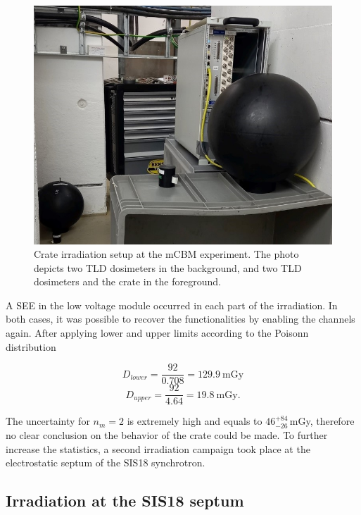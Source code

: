 \newpage
\begin{figure}[!h]
    \centering
    \includegraphics[width=0.5\columnwidth]{Chapter4/images/crate.jpg}
    \caption{Crate irradiation setup at the \gls{mCBM} experiment. The photo depicts two TLD dosimeters in the background, and two TLD dosimeters and the crate in the foreground.}
    \label{fig:crate}
\end{figure}

A \gls{SEE} in the low voltage module occurred in each part of the irradiation. In both cases, it was possible to recover the functionalities by enabling the channels again. After applying lower and upper limits according to the Poisonn distribution

\begin{equation}
    D_{lower}=\frac{92}{0.708} = 129.9\mathrm{\ mGy}
\end{equation}
\begin{equation}
    D_{upper}=\frac{92}{4.64} = 19.8\mathrm{\ mGy}.
\end{equation}

The uncertainty for $n_{m}=2$ is extremely high and equals to $\mathrm{46}_{-26}^{+84}$\,mGy, therefore no clear conclusion on the behavior of the crate could be made. To further increase the statistics, a second irradiation campaign took place at the electrostatic septum of the SIS18 synchrotron. 

\subsection{Irradiation at the SIS18 septum}
